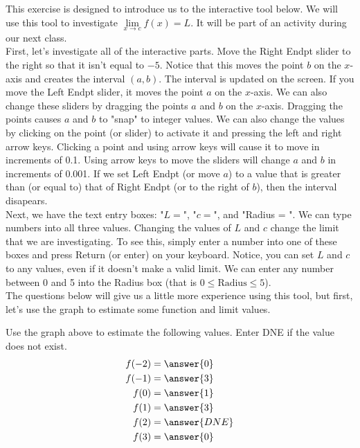 \documentclass{ximera}
\author{Kevin James}
\begin{document}
   \begin{exercise}
   	This exercise is designed to introduce us to the interactive tool below.  We will use this tool to investigate $ \lim\limits_{x \to c}f(x)=L $.  It will be part of an activity during our next class.  \\
   	   	
   	First, let's investigate all of the interactive parts.  Move the Right Endpt slider to the right so that it isn't equal to $-5$.  Notice that this moves the point $b$ on the $x$-axis and creates the interval $(a,b)$. The interval is updated on the screen.  If you move the Left Endpt slider, it moves the point $a$ on the $x$-axis.  We can also change these sliders by dragging the points $a$ and $b$ on the $x$-axis.  Dragging the points causes $a$ and $b$ to "snap" to integer values.  We can also change the values by clicking on the point (or slider) to activate it and pressing the left and right arrow keys.  Clicking a point and using arrow keys will cause it to move in increments of 0.1.  Using arrow keys to move the sliders will change $a$ and $b$ in increments of 0.001. If we set Left Endpt (or move $a$) to a value that is greater than (or equal to) that of Right Endpt (or to the right of $b$), then the interval disapears.\\
   	
   	Next, we have the text entry boxes: "$L = $", "$c=$", and "Radius = ".  We can type numbers into all three values.  Changing the values of $L$ and $c$ change the limit that we are investigating.  To see this, simply enter a number into one of these boxes and press Return (or enter) on your keyboard.  Notice, you can set $L$ and $c$ to any values, even if it doesn't make a valid limit.  We can enter any number between 0 and 5 into the Radius box (that is $ 0 \leq \text{Radius} \leq 5 $). \\
   	
   	The questions below will give us a little more experience using this tool, but first, let's use the graph to estimate some function and limit values.
   	
   	\begin{center}
   		\begin{onlineOnly}
   		\end{onlineOnly} 
   	\end{center}
   	
   	\begin{question} Use the graph above to estimate the following values.  Enter DNE if the value does not exist.
   		\begin{align*}
   			f(-2) &= \answer{0} \\
   			f(-1) &= \answer{3}  \\
   			f(0) &= \answer{1}  \\
   			f(1) &= \answer{3} \\
   			f(2) &= \answer{DNE} \\
   			f(3) &= \answer{0}
   		\end{align*}
   	\end{question}
   	

\end{exercise}
\end{document}
